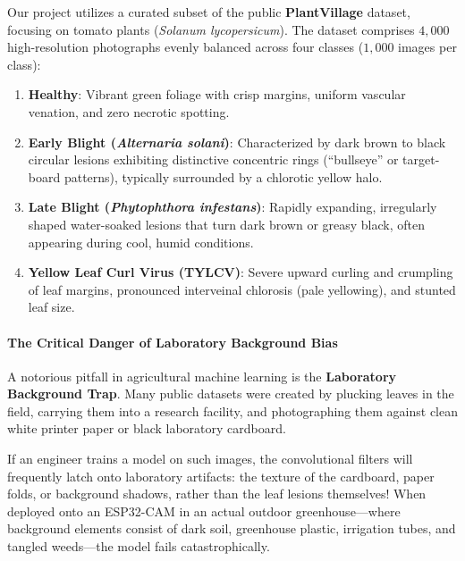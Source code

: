 Our project utilizes a curated subset of the public \textbf{PlantVillage} dataset, focusing on tomato plants (\emph{Solanum lycopersicum}). The dataset comprises $4{,}000$ high-resolution photographs evenly balanced across four classes ($1{,}000$ images per class):
\begin{enumerate}
    \item \textbf{Healthy}: Vibrant green foliage with crisp margins, uniform vascular venation, and zero necrotic spotting.
    \item \textbf{Early Blight (\emph{Alternaria solani})}: Characterized by dark brown to black circular lesions exhibiting distinctive concentric rings (``bullseye'' or target-board patterns), typically surrounded by a chlorotic yellow halo.
    \item \textbf{Late Blight (\emph{Phytophthora infestans})}: Rapidly expanding, irregularly shaped water-soaked lesions that turn dark brown or greasy black, often appearing during cool, humid conditions.
    \item \textbf{Yellow Leaf Curl Virus (TYLCV)}: Severe upward curling and crumpling of leaf margins, pronounced interveinal chlorosis (pale yellowing), and stunted leaf size.
\end{enumerate}

\paragraph{The Critical Danger of Laboratory Background Bias}
A notorious pitfall in agricultural machine learning is the \textbf{Laboratory Background Trap}. Many public datasets were created by plucking leaves in the field, carrying them into a research facility, and photographing them against clean white printer paper or black laboratory cardboard.

If an engineer trains a model on such images, the convolutional filters will frequently latch onto laboratory artifacts: the texture of the cardboard, paper folds, or background shadows, rather than the leaf lesions themselves! When deployed onto an ESP32-CAM in an actual outdoor greenhouse—where background elements consist of dark soil, greenhouse plastic, irrigation tubes, and tangled weeds—the model fails catastrophically.

